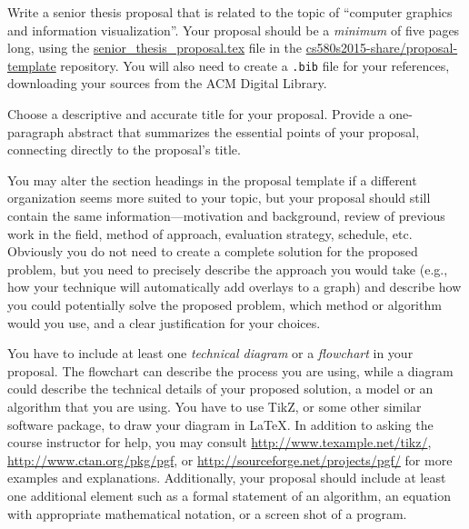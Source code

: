 

\usepackage{ulem}
\usepackage[compact]{titlesec}




Write a senior thesis proposal that is related to the topic of ``computer graphics and information visualization''.
Your proposal should be a {\em minimum} of five pages long, using the \url{senior_thesis_proposal.tex} file in the
\url{cs580s2015-share/proposal-template} repository.  You will also need to create a {\tt .bib} file for your
references, downloading your sources from the ACM Digital Library.

Choose a descriptive and accurate title for your proposal. Provide a one-paragraph abstract that summarizes the
essential points of your proposal, connecting directly to the proposal's title.

You may alter the section headings in the proposal template if a different organization seems more suited to your topic,
but your proposal should still contain the same information---motivation and background, review of previous work in the
field, method of approach, evaluation strategy, schedule, etc. Obviously you do not need to create a complete solution
for the proposed problem, but you need to precisely describe the approach you would take (e.g., how your technique will
automatically add overlays to a graph) and describe how you could potentially solve the proposed problem, which method
or algorithm would you use, and a clear justification for your choices.

You have to include at least one {\em technical diagram} or a {\em flowchart} in your proposal. The flowchart can
describe the process you are using, while a diagram could describe the technical details of your proposed solution, a
model or an algorithm that you are using. You have to use TikZ, or some other similar software package, to draw your
diagram in \LaTeX. In addition to asking the course instructor for help, you may consult
\url{http://www.texample.net/tikz/}, \url{http://www.ctan.org/pkg/pgf}, or \url{http://sourceforge.net/projects/pgf/}
for more examples and explanations. Additionally, your proposal should include at least one additional element such as
a formal statement of an algorithm, an equation with appropriate mathematical notation, or a screen shot of a program.

